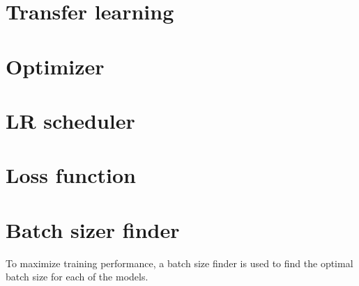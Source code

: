 \section{Transfer learning}
\section{Optimizer}
\section{LR scheduler}
\section{Loss function}
\section{Batch sizer finder}
To maximize training performance, a batch size finder is used to find the optimal batch size for each of the models. 

